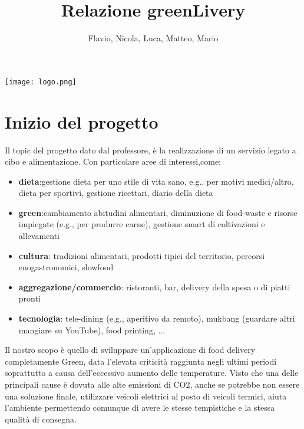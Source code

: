 \documentclass{article}
\begin{document}
\begin{center}
\texttt{[image: logo.png]}
\title{Relazione greenLivery}
\author{Flavio, Nicola, Luca, Matteo, Mario}
\end{center}
\renewcommand{\contentsname}{Indice}

\maketitle
\tableofcontents

\section{Inizio del progetto}\par

Il topic del progetto dato dal professore, è la realizzazione di un servizio legato a cibo e alimentazione. Con particolare aree di interessi,come: \par
\begin{itemize}
    \item \textbf{dieta}:gestione dieta per uno stile di vita sano, e.g., per motivi medici/altro, dieta per sportivi, gestione ricettari, diario della dieta \par
    \item \textbf{green}:cambiamento abitudini alimentari, diminuzione di food-waste e risorse impiegate (e.g., per produrre carne), gestione smart di coltivazioni e allevamenti \par
    \item \textbf{cultura}: tradizioni alimentari, prodotti tipici del territorio, percorsi enogastronomici, slowfood\par
    \item \textbf{aggregazione/commercio}: ristoranti, bar, delivery della spesa o di piatti pronti \par
    \item \textbf{tecnologia}: tele-dining (e.g., aperitivo da remoto), mukbang (guardare altri mangiare su YouTube), food printing, ... \par
\end{itemize}
\vspace{1cm}



     \par
    Il nostro scopo è quello di sviluppare un’applicazione di food delivery completamente Green, data l'elevata criticità raggiunta negli ultimi periodi soprattutto a causa dell'eccessivo aumento delle temperature. Visto che una delle principali cause è dovuta alle alte emissioni di CO2, anche se potrebbe non essere una soluzione finale, utilizzare veicoli elettrici al posto di veicoli termici, aiuta l’ambiente permettendo comunque di avere le stesse tempistiche e la stessa qualità di consegna.
    \vspace{1cm}
    
\end{document}
